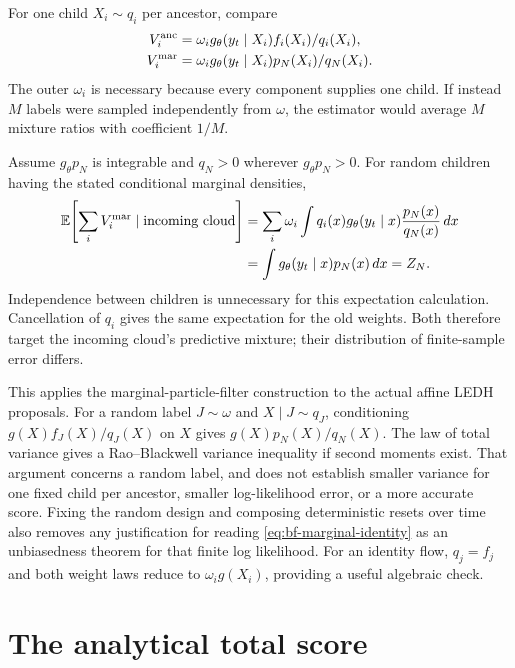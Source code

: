 For one child $X_i\sim q_i$ per ancestor, compare
\begin{align}
 V_i^{\rm anc}&=\omega_i g_\theta(y_t\mid X_i)f_i(X_i)/q_i(X_i),\notag\\
 V_i^{\rm mar}&=\omega_i g_\theta(y_t\mid X_i)p_N(X_i)/q_N(X_i).
 \label{eq:bf-marginal-weight}
\end{align}
The outer $\omega_i$ is necessary because every component supplies one child.
If instead $M$ labels were sampled independently from $\omega$, the estimator
would average $M$ mixture ratios with coefficient $1/M$.

Assume $g_\theta p_N$ is integrable and $q_N>0$ wherever $g_\theta p_N>0$.
For random children having the stated conditional marginal densities,
\begin{align}
 \mathbb E\!\left[\sum_iV_i^{\rm mar}\mid\hbox{incoming cloud}\right]
 &=\sum_i\omega_i\int q_i(x)g_\theta(y_t\mid x)
                                  \frac{p_N(x)}{q_N(x)}\,dx\notag\\
 &=\int g_\theta(y_t\mid x)p_N(x)\,dx=Z_N.
 \label{eq:bf-marginal-identity}
\end{align}
Independence between children is unnecessary for this expectation calculation.
Cancellation of $q_i$ gives the same expectation for the old weights. Both
therefore target the incoming cloud's predictive mixture; their distribution
of finite-sample error differs.

This applies the marginal-particle-filter construction
\citep[Section~3]{klaas2005marginal} to the actual affine LEDH proposals.
For a random label $J\sim\omega$ and $X\mid J\sim q_J$, conditioning
$g(X)f_J(X)/q_J(X)$ on $X$ gives $g(X)p_N(X)/q_N(X)$.
The law of total variance gives a Rao--Blackwell variance inequality if second
moments exist. That argument concerns a random label, and does not establish
smaller variance for one fixed child per ancestor, smaller log-likelihood
error, or a more accurate score. Fixing the random design and composing
deterministic resets over time also removes any justification for reading
\eqref{eq:bf-marginal-identity} as an unbiasedness theorem for that finite
log likelihood. For an identity flow, $q_j=f_j$ and both weight laws reduce
to $\omega_i g(X_i)$, providing a useful algebraic check.

\section{The analytical total score}
\label{sec:bf-pfpf-marginal-total-score}

